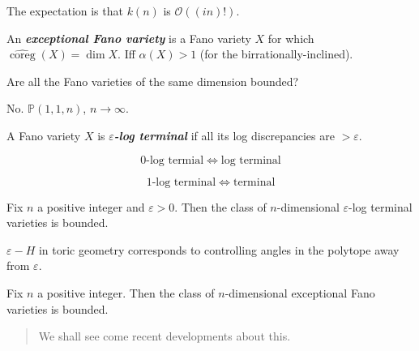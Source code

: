 \begin{remark}
\label{remark-moraga-7}
The expectation is that $k(n)$ is
$\mathcal{O}((in)!)$.
\end{remark}

\begin{definition}
\label{definition-moraga-14}
An \textit{\textbf{exceptional Fano variety}}
is a Fano variety $X$ for which
$\hat{\operatorname{coreg}}(X)=\dim X$. Iff
$\alpha(X)>1$ (for the
birrationally-inclined).
\end{definition}

\medskip{}

\medskip{} Are all the
Fano varieties of the same dimension bounded?

\medskip{}
No. $\mathbb{P}(1,1,n)$, $n\to \infty$.

\begin{definition}
\label{definition-moraga-15}
A Fano variety $X$ is
\textit{\textbf{$\varepsilon $-log terminal}}
if all its log discrepancies are
$>\varepsilon $.

$$
0\text{-log termial} \iff\text{log terminal}
$$

$$
1\text{-log terminal} \iff\text{terminal}
$$

\end{definition}

\begin{theorem}
\label{theorem-moraga-19}
Fix $n$ a positive integer and $\varepsilon
>0$. Then the class of $n$-dimensional
$\varepsilon $-log terminal varieties is
bounded.

$\varepsilon -H$ in toric geometry
corresponds to controlling angles in the
polytope away from $\varepsilon $.
\end{theorem}

\begin{theorem}
\label{theorem-moraga-20}
Fix $n$ a positive integer. Then the class of
$n$-dimensional exceptional Fano varieties is
bounded.
\end{theorem}

\begin{quotation}
We shall see come recent developments about
this.
\end{quotation}

